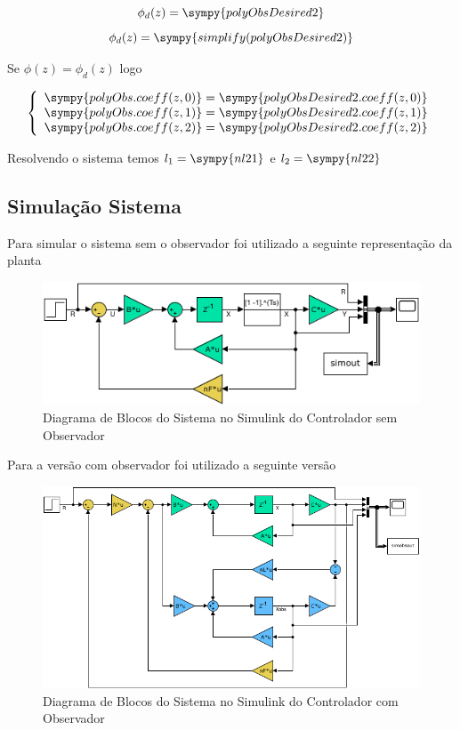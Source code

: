 \documentclass[a4paper,11pt]{article}
\begin{document}
$$\phi_d(z) = \sympy{polyObsDesired2}$$
$$\phi_d(z) = \sympy{simplify(polyObsDesired2)}$$

Se $\phi(z) = \phi_d(z)$ logo

$$
\left\{
    \begin{array}{l}
        \sympy{polyObs.coeff(z,0)} = \sympy{polyObsDesired2.coeff(z,0)}\\
        \sympy{polyObs.coeff(z,1)} = \sympy{polyObsDesired2.coeff(z,1)}\\
        \sympy{polyObs.coeff(z,2)} = \sympy{polyObsDesired2.coeff(z,2)}\\
    \end{array}
\right.
$$

Resolvendo o sistema temos $l_1 = \sympy{nl21} $ e $l_2 = \sympy{nl22}$

\subsection{Simulação Sistema}

Para simular o sistema sem o observador foi utilizado a seguinte representação da planta

\begin{figure}[H]
    \centering
    \includegraphics[width=0.9\linewidth]{img/exsim6_ss_model.png}
    \caption{Diagrama de Blocos do Sistema no Simulink do Controlador sem Observador}
\end{figure}

Para a versão com observador foi utilizado a seguinte versão

\begin{figure}[H]
    \centering
    \includegraphics[width=0.9\linewidth]{img/exsim6_ss_observer_model.png}
    \caption{Diagrama de Blocos do Sistema no Simulink do Controlador com Observador}
\end{figure}
\end{document}

